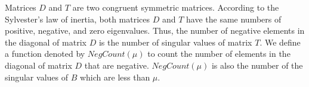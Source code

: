 Matrices $D$ and $T$ are two congruent symmetric matrices.
According to the Sylvester's law of inertia, both matrices $D$ and $T$ have the same numbers of positive, negative, and zero eigenvalues.
Thus, the number of negative elements in the diagonal of matrix $D$ is the number of singular values of matrix $T$.
We define a function denoted by $NegCount(\mu)$ to count the number of elements  in the diagonal of matrix $D$ that are negative. %
$NegCount(\mu)$ is also the number of the singular values of $B$ which are less than $\mu$.
% 

%

